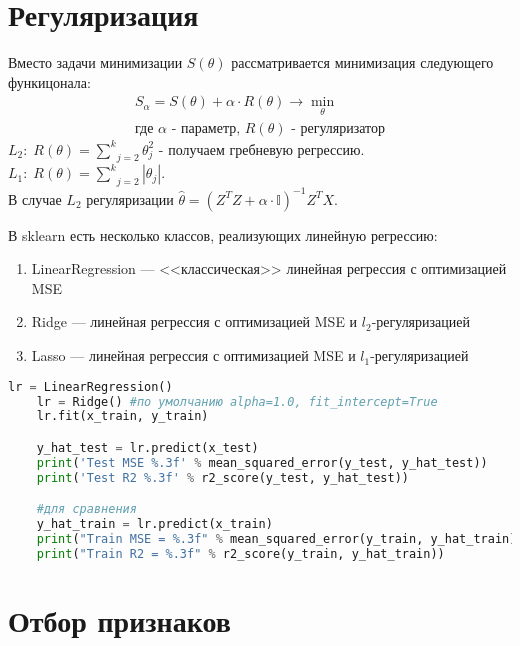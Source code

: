 \section{Регуляризация}\label{cha:linreg2/sec:regul}

Вместо задачи минимизации $S(\theta)$ рассматривается минимизация следующего функицонала:
$$\begin{gathered}
	S_{\alpha} = S(\theta) + \alpha \cdot R(\theta) \to \underset{\theta}{\min} \\
	\text{где } \alpha \text{ - параметр, } R(\theta) \text{ - регуляризатор}
\end{gathered}$$
$L_2: \; R(\theta) = \underset{j=2}{\overset{k}{\sum}}\theta_j^2$ - получаем гребневую регрессию. \\
$L_1: \; R(\theta) = \underset{j=2}{\overset{k}{\sum}}|\theta_j|$.\\

В случае $L_2$ регуляризации $\displaystyle \hat{\theta} = \left( Z^T Z + \alpha \cdot \mathbb{I} \right)^{-1} Z^T X$.

В sklearn есть несколько классов, реализующих линейную регрессию:
\begin{enumerate}
	\item LinearRegression — <<классическая>> линейная регрессия с оптимизацией MSE
	\item Ridge — линейная регрессия с оптимизацией MSE и $l_2$-регуляризацией
	\item Lasso — линейная регрессия с оптимизацией MSE и $l_1$-регуляризацией
\end{enumerate}

\begin{lstlisting}[language=Python]
	lr = LinearRegression()
	lr = Ridge() #по умолчанию alpha=1.0, fit_intercept=True
	lr.fit(x_train, y_train)

	y_hat_test = lr.predict(x_test)
	print('Test MSE %.3f' % mean_squared_error(y_test, y_hat_test))
	print('Test R2 %.3f' % r2_score(y_test, y_hat_test))

	#для сравнения
	y_hat_train = lr.predict(x_train)
	print("Train MSE = %.3f" % mean_squared_error(y_train, y_hat_train))
	print("Train R2 = %.3f" % r2_score(y_train, y_hat_train))
\end{lstlisting}

\section{Отбор признаков}\label{cha:linreg2/sec:otborprizn}

